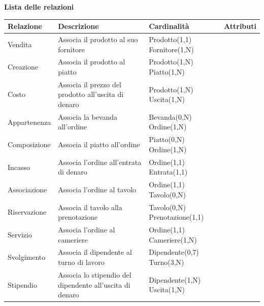\textbf{Lista delle relazioni} %
\begin{longtable}{p{2.5cm} p{5.5cm} p{3.5cm} p{2.5cm}}
    \midrule
    \textbf{Relazione} & \textbf{Descrizione} & \textbf{Cardinalità} & \textbf{Attributi} \\ \midrule
    Vendita & Associa il prodotto al suo fornitore & Prodotto(1,1) \newline Fornitore(1,N) &  \\ \midrule
    Creazione & Associa il prodotto al piatto & Prodotto(1,N) \newline Piatto(1,N) & \\ \midrule
    Costo & Associa il prezzo del prodotto all'uscita di denaro & Prodotto(1,N) \newline Uscita(1,N) & \\ \midrule
    Appartenenza & Associa la bevanda all'ordine & Bevanda(0,N) \newline Ordine(1,N) &  \\ \midrule
    Composizione & Associa il piatto all'ordine & Piatto(0,N) \newline Ordine(1,N) &  \\ \midrule
    Incasso & Associa l'ordine all'entrata di denaro & Ordine(1,1) \newline Entrata(1,1) &  \\ \midrule
    Associazione & Associa l'ordine al tavolo & Ordine(1,1) \newline Tavolo(0,N) &  \\ \midrule
    Riservazione & Associa il tavolo alla prenotazione & Tavolo(0,N) \newline Prenotazione(1,1) &  \\ \midrule
    Servizio & Associa l'ordine al cameriere & Ordine(1,1) \newline Cameriere(1,N) & \\ \midrule
    Svolgimento & Associa il dipendente al turno di lavoro & Dipendente(0,7) \newline Turno(3,N) & \\ \midrule
    Stipendio & Associa lo stipendio del dipendente all'uscita di denaro & Dipendente(1,N) \newline Uscita(1,N) &  \\ \bottomrule
\end{longtable}

